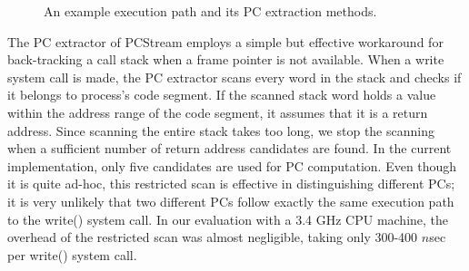 \begin{figure}[t]
	\centering
	\hfill
	\caption{An example execution path and its PC extraction methods.}
	\label{fig:getpc}
\end{figure}

The PC extractor of \textsf{\small PCStream} employs a simple but effective
workaround for back-tracking a call stack when a frame pointer is not
available.  When a write system call is made, the PC extractor scans every word
in the stack and checks if it belongs to process's code segment.  If the
scanned stack word holds a value within the address range of the code segment,
it assumes that it is a return address.  Since scanning the entire stack takes
too long, we stop the scanning when a sufficient number of return address
candidates are found. In the current implementation, only five candidates are
used for PC computation.  Even though it is quite ad-hoc, this restricted scan
is effective in distinguishing different PCs; it is very unlikely that two
different PCs follow exactly the same execution path to the \textsf{\small
write()} system call.  In our evaluation with a 3.4 GHz CPU machine, the
overhead of the restricted scan was almost negligible, taking only 300-400
$n$sec per \textsf{\small write()} system call.

